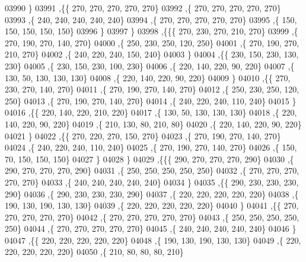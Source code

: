 \begin{DoxyCode}
03990     \}
03991    ,\{\{   270,   270,   270,   270,   270\}
03992     ,\{   270,   270,   270,   270,   270\}
03993     ,\{   240,   240,   240,   240,   240\}
03994     ,\{   270,   270,   270,   270,   270\}
03995     ,\{   150,   150,   150,   150,   150\}
03996     \}
03997    \}
03998   ,\{\{\{   270,   230,   270,   210,   270\}
03999     ,\{   270,   190,   270,   140,   270\}
04000     ,\{   250,   230,   250,   120,   250\}
04001     ,\{   270,   190,   270,   210,   270\}
04002     ,\{   240,   220,   240,   150,   240\}
04003     \}
04004    ,\{\{   230,   150,   230,   130,   230\}
04005     ,\{   230,   150,   230,   100,   230\}
04006     ,\{   220,   140,   220,    90,   220\}
04007     ,\{   130,    50,   130,   130,   130\}
04008     ,\{   220,   140,   220,    90,   220\}
04009     \}
04010    ,\{\{   270,   230,   270,   140,   270\}
04011     ,\{   270,   190,   270,   140,   270\}
04012     ,\{   250,   230,   250,   120,   250\}
04013     ,\{   270,   190,   270,   140,   270\}
04014     ,\{   240,   220,   240,   110,   240\}
04015     \}
04016    ,\{\{   220,   140,   220,   210,   220\}
04017     ,\{   130,    50,   130,   130,   130\}
04018     ,\{   220,   140,   220,    90,   220\}
04019     ,\{   210,   130,    80,   210,    80\}
04020     ,\{   220,   140,   220,    90,   220\}
04021     \}
04022    ,\{\{   270,   220,   270,   150,   270\}
04023     ,\{   270,   190,   270,   140,   270\}
04024     ,\{   240,   220,   240,   110,   240\}
04025     ,\{   270,   190,   270,   140,   270\}
04026     ,\{   150,    70,   150,   150,   150\}
04027     \}
04028    \}
04029   ,\{\{\{   290,   270,   270,   270,   290\}
04030     ,\{   290,   270,   270,   270,   290\}
04031     ,\{   250,   250,   250,   250,   250\}
04032     ,\{   270,   270,   270,   270,   270\}
04033     ,\{   240,   240,   240,   240,   240\}
04034     \}
04035    ,\{\{   290,   230,   230,   230,   290\}
04036     ,\{   290,   230,   230,   230,   290\}
04037     ,\{   220,   220,   220,   220,   220\}
04038     ,\{   190,   130,   190,   130,   130\}
04039     ,\{   220,   220,   220,   220,   220\}
04040     \}
04041    ,\{\{   270,   270,   270,   270,   270\}
04042     ,\{   270,   270,   270,   270,   270\}
04043     ,\{   250,   250,   250,   250,   250\}
04044     ,\{   270,   270,   270,   270,   270\}
04045     ,\{   240,   240,   240,   240,   240\}
04046     \}
04047    ,\{\{   220,   220,   220,   220,   220\}
04048     ,\{   190,   130,   190,   130,   130\}
04049     ,\{   220,   220,   220,   220,   220\}
04050     ,\{   210,    80,    80,    80,   210\}

\end{DoxyCode}
